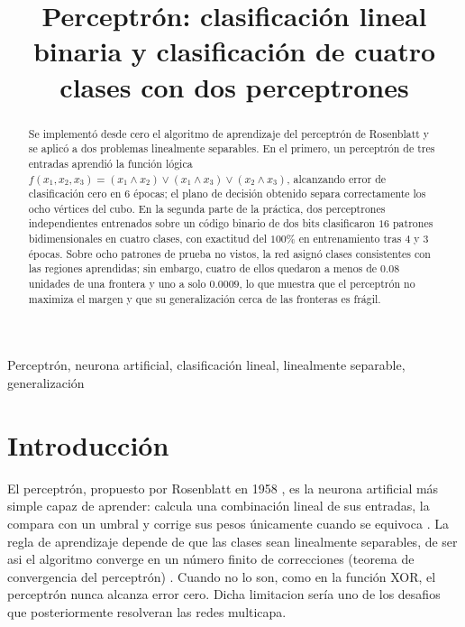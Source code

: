 \documentclass[conference]{IEEEtran}
\begin{document}
\title{Perceptrón: clasificación lineal binaria y clasificación de cuatro clases con dos perceptrones}

\author{
}

\maketitle

\begin{abstract}
    Se implementó desde cero el algoritmo de aprendizaje del perceptrón de
    Rosenblatt y se aplicó a dos problemas linealmente separables.
    En el primero, un perceptrón de tres entradas aprendió la función
    lógica $f(x_1,x_2,x_3)=(x_1\wedge x_2)\vee(x_1\wedge x_3)\vee(x_2\wedge x_3)$,
    alcanzando error de clasificación cero en $6$ épocas; el plano de decisión
    obtenido separa correctamente los ocho vértices del cubo. En la segunda parte de
    la práctica, dos perceptrones independientes entrenados sobre un
    código binario de dos bits clasificaron $16$ patrones bidimensionales en
    cuatro clases, con exactitud del $100\%$ en entrenamiento tras $4$ y $3$
    épocas. Sobre ocho patrones de prueba no vistos, la red asignó clases
    consistentes con las regiones aprendidas; sin embargo, cuatro de ellos
    quedaron a menos de $0.08$ unidades de una frontera y uno a solo
    $0.0009$, lo que muestra que el perceptrón no maximiza el margen y que su
    generalización cerca de las fronteras es frágil.
\end{abstract}

\begin{IEEEkeywords}
Perceptrón, neurona artificial, clasificación lineal, linealmente separable, generalización
\end{IEEEkeywords}

\section{Introducción}
El perceptrón, propuesto por Rosenblatt en 1958 \cite{b4}, es la neurona artificial más
simple capaz de aprender: calcula una combinación lineal de sus entradas,
la compara con un umbral y corrige sus pesos únicamente cuando se equivoca
\cite{b1,b2}. La regla de aprendizaje depende de que las
clases sean linealmente separables, de ser asi el algoritmo converge en un número finito
de correcciones (teorema de convergencia del perceptrón) \cite{b1,b3}. Cuando
no lo son, como en la función XOR, el perceptrón nunca alcanza error cero.
Dicha limitacion sería uno de los desafios que posteriormente resolveran las redes 
multicapa.
\end{document}
